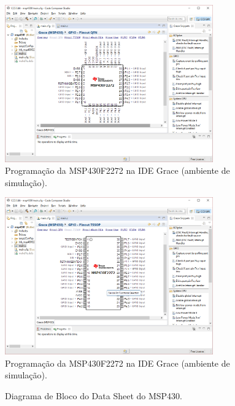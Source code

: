 \documentclass[
	12pt,				%
	openright,			%
  oneside,     %
	a4paper,			%
	english,			%
	french,				%
	spanish,			%
	brazil				%
	]{abntex2}
\begin{document}
\begin{figure}[ht]
  \centering
  \caption{\label{fig:APP-Grace01}Programação da MSP430F2272 na IDE Grace (ambiente de simulação).}
  \includegraphics[width=0.8\textwidth]{images/Atividade05/APP-Grace01.png}
\end{figure}

\begin{figure}[ht]
  \centering
  \caption{\label{fig:APP-Grace02}Programação da MSP430F2272 na IDE Grace (ambiente de simulação).}
  \includegraphics[width=0.8\textwidth]{images/Atividade05/APP-Grace02.png}
\end{figure}

\newpage
\begin{figure}[H]
  \centering
  
  \caption{\label{fig:cha-5-diagrama-bloco}Diagrama de Bloco do Data Sheet do MSP430.}  
\end{figure}
\end{document}
